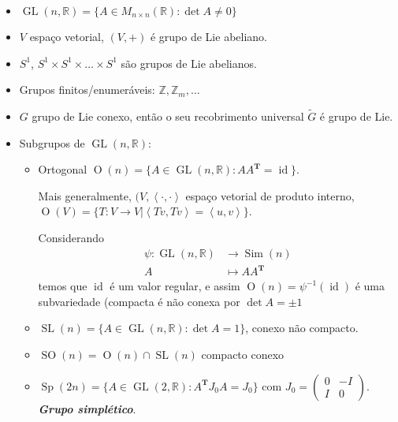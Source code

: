 \begin{example}\leavevmode
	\begin{itemize}
	\item $\operatorname{GL}(n,\mathbb{R})=\{A\in M_{n\times n}(\mathbb{R}):\det A \neq 0\}$ 
	\item $V$ espaço vetorial, $(V,+)$  \'e grupo de Lie abeliano.
	\item  $S^1$, $S^1\times S^1\times \ldots\times S^1$ s\~ao grupos de Lie abelianos.
	\item Grupos finitos/enumer\'aveis: $\mathbb{Z},\mathbb{Z}_m,\ldots$ 
	\item 
		\begin{exercise}
			$G$ grupo de Lie conexo, ent\~ao o seu recobrimento universal $\tilde{G}$ \'e grupo de Lie.
		\end{exercise}
	\item Subgrupos de $\operatorname{GL}(n,\mathbb{R})$:
		\begin{itemize}
		\item Ortogonal $\operatorname{O}(n)=\{A\in\operatorname{GL}(n,\mathbb{R}):A A^{\mathbf{T}}=\operatorname{id}\}$.

			Mais generalmente, $(V,\left<\cdot,\cdot\right> $ espaço vetorial de produto interno, $\operatorname{O}(V) =\{T:V\to V|\left<Tv,Tv\right> =\left<u,v\right> \}$.

			Considerando
			\begin{align*}
				\psi:\operatorname{GL}(n,\mathbb{R}) &\longrightarrow \operatorname{Sim}(n) \\
				A &\longmapsto A A^{\mathbf{T}}
			\end{align*}
			temos que $\operatorname{id}$ \'e um valor regular, e assim $\operatorname{O}(n)=\psi^{-1}(\operatorname{id})$ \'e uma subvariedade (compacta \'e n\~ao conexa por $\det A=\pm 1$
	
	\item $\operatorname{SL}(n) =\{A\in\operatorname{GL}(n,\mathbb{R}):\det A=1\}$, conexo n\~ao compacto.

	\item $\operatorname{SO}(n) =\operatorname{O}(n) \cap \operatorname{SL}(n)$ compacto conexo

	\item $\operatorname{Sp}(2n) =\{A\in\operatorname{GL}(2,\mathbb{R}):A^{\mathbf{T}}J_0A=J_0\}$ com $J_0=\begin{pmatrix} 0&-I\\I&0 \end{pmatrix} $. \textit{\textbf{Grupo simpl\'etico}}.


\end{itemize}
\end{itemize}
\end{example}

